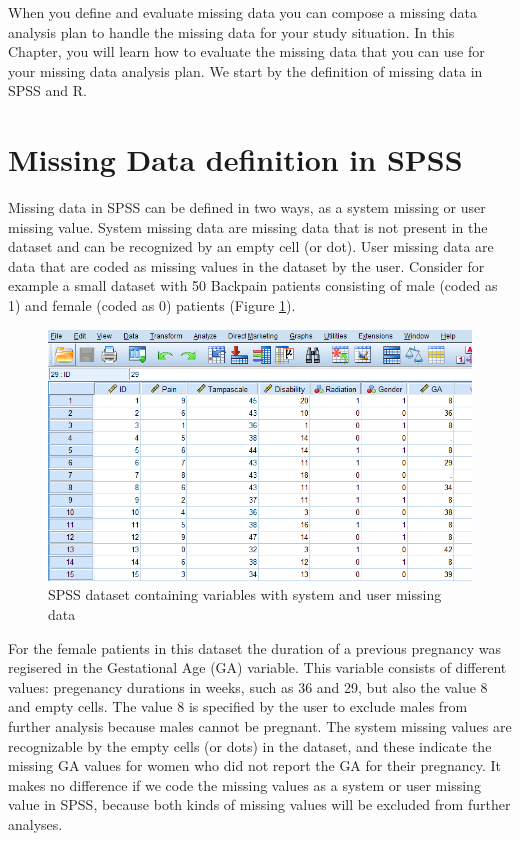 \documentclass[
]{book}
\begin{document}
When you define and evaluate missing data you can compose a missing data analysis plan to handle the missing data for your study situation. In this Chapter, you will learn how to evaluate the missing data that you can use for your missing data analysis plan. We start by the definition of missing data in SPSS and R.

\hypertarget{missing-data-definition-in-spss}{%
\section{Missing Data definition in SPSS}\label{missing-data-definition-in-spss}}

Missing data in SPSS can be defined in two ways, as a system missing or user missing value. System missing data are missing data that is not present in the dataset and can be recognized by an empty cell (or dot). User missing data are data that are coded as missing values in the dataset by the user. Consider for example a small dataset with 50 Backpain patients consisting of male (coded as 1) and female (coded as 0) patients (Figure \ref{fig:fig2-1}).

\begin{figure}

{\centering \includegraphics[width=0.9\linewidth]{images/fig2.1} 

}

\caption{SPSS dataset containing variables with system and user missing data}\label{fig:fig2-1}
\end{figure}

For the female patients in this dataset the duration of a previous pregnancy was regisered in the Gestational Age (GA) variable. This variable consists of different values: pregenancy durations in weeks, such as 36 and 29, but also the value 8 and empty cells. The value 8 is specified by the user to exclude males from further analysis because males cannot be pregnant. The system missing values are recognizable by the empty cells (or dots) in the dataset, and these indicate the missing GA values for women who did not report the GA for their pregnancy. It makes no difference if we code the missing values as a system or user missing value in SPSS, because both kinds of missing values will be excluded from further analyses.
\end{document}
